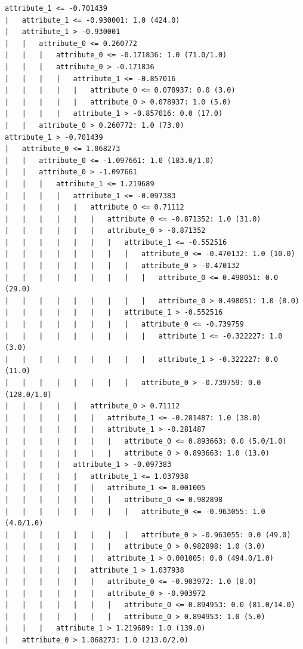 \documentclass[a4paper]{article}
\theoremstyle{definition}
\newenvironment{soln}{
    \leavevmode\color{blue}\ignorespaces
}{}
\begin{document}
\begin{soln}
\begin{lstlisting}
attribute_1 <= -0.701439
|   attribute_1 <= -0.930001: 1.0 (424.0)
|   attribute_1 > -0.930001
|   |   attribute_0 <= 0.260772
|   |   |   attribute_0 <= -0.171836: 1.0 (71.0/1.0)
|   |   |   attribute_0 > -0.171836
|   |   |   |   attribute_1 <= -0.857016
|   |   |   |   |   attribute_0 <= 0.078937: 0.0 (3.0)
|   |   |   |   |   attribute_0 > 0.078937: 1.0 (5.0)
|   |   |   |   attribute_1 > -0.857016: 0.0 (17.0)
|   |   attribute_0 > 0.260772: 1.0 (73.0)
attribute_1 > -0.701439
|   attribute_0 <= 1.068273
|   |   attribute_0 <= -1.097661: 1.0 (183.0/1.0)
|   |   attribute_0 > -1.097661
|   |   |   attribute_1 <= 1.219689
|   |   |   |   attribute_1 <= -0.097383
|   |   |   |   |   attribute_0 <= 0.71112
|   |   |   |   |   |   attribute_0 <= -0.871352: 1.0 (31.0)
|   |   |   |   |   |   attribute_0 > -0.871352
|   |   |   |   |   |   |   attribute_1 <= -0.552516
|   |   |   |   |   |   |   |   attribute_0 <= -0.470132: 1.0 (10.0)
|   |   |   |   |   |   |   |   attribute_0 > -0.470132
|   |   |   |   |   |   |   |   |   attribute_0 <= 0.498051: 0.0 (29.0)
|   |   |   |   |   |   |   |   |   attribute_0 > 0.498051: 1.0 (8.0)
|   |   |   |   |   |   |   attribute_1 > -0.552516
|   |   |   |   |   |   |   |   attribute_0 <= -0.739759
|   |   |   |   |   |   |   |   |   attribute_1 <= -0.322227: 1.0 (3.0)
|   |   |   |   |   |   |   |   |   attribute_1 > -0.322227: 0.0 (11.0)
|   |   |   |   |   |   |   |   attribute_0 > -0.739759: 0.0 (128.0/1.0)
|   |   |   |   |   attribute_0 > 0.71112
|   |   |   |   |   |   attribute_1 <= -0.281487: 1.0 (38.0)
|   |   |   |   |   |   attribute_1 > -0.281487
|   |   |   |   |   |   |   attribute_0 <= 0.893663: 0.0 (5.0/1.0)
|   |   |   |   |   |   |   attribute_0 > 0.893663: 1.0 (13.0)
|   |   |   |   attribute_1 > -0.097383
|   |   |   |   |   attribute_1 <= 1.037938
|   |   |   |   |   |   attribute_1 <= 0.001005
|   |   |   |   |   |   |   attribute_0 <= 0.982898
|   |   |   |   |   |   |   |   attribute_0 <= -0.963055: 1.0 (4.0/1.0)
|   |   |   |   |   |   |   |   attribute_0 > -0.963055: 0.0 (49.0)
|   |   |   |   |   |   |   attribute_0 > 0.982898: 1.0 (3.0)
|   |   |   |   |   |   attribute_1 > 0.001005: 0.0 (494.0/1.0)
|   |   |   |   |   attribute_1 > 1.037938
|   |   |   |   |   |   attribute_0 <= -0.903972: 1.0 (8.0)
|   |   |   |   |   |   attribute_0 > -0.903972
|   |   |   |   |   |   |   attribute_0 <= 0.894953: 0.0 (81.0/14.0)
|   |   |   |   |   |   |   attribute_0 > 0.894953: 1.0 (5.0)
|   |   |   attribute_1 > 1.219689: 1.0 (139.0)
|   attribute_0 > 1.068273: 1.0 (213.0/2.0)


\end{lstlisting}
\end{soln}
\end{document}
